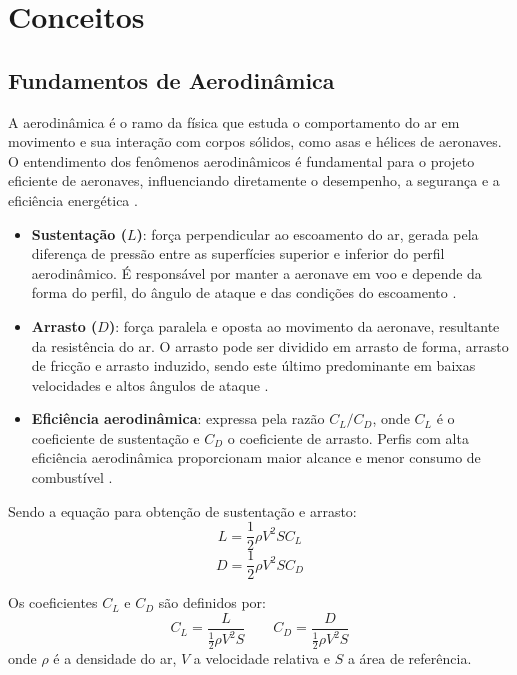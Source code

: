 \chapter{Conceitos}

\section{Fundamentos de Aerodinâmica}
A aerodinâmica é o ramo da física que estuda o comportamento do ar em movimento e sua interação com corpos sólidos, como asas e hélices de aeronaves. O entendimento dos fenômenos aerodinâmicos é fundamental para o projeto eficiente de aeronaves, influenciando diretamente o desempenho, a segurança e a eficiência energética \cite{anderson2017fundamentals}.

\begin{itemize}
    \item \textbf{Sustentação (\(L\))}: força perpendicular ao escoamento do ar, gerada pela diferença de pressão entre as superfícies superior e inferior do perfil aerodinâmico. É responsável por manter a aeronave em voo e depende da forma do perfil, do ângulo de ataque e das condições do escoamento \cite{anderson2017fundamentals}.
    \item \textbf{Arrasto (\(D\))}: força paralela e oposta ao movimento da aeronave, resultante da resistência do ar. O arrasto pode ser dividido em arrasto de forma, arrasto de fricção e arrasto induzido, sendo este último predominante em baixas velocidades e altos ângulos de ataque \cite{raymer2018aircraft}.
    \item \textbf{Eficiência aerodinâmica}: expressa pela razão \(C_L/C_D\), onde \(C_L\) é o coeficiente de sustentação e \(C_D\) o coeficiente de arrasto. Perfis com alta eficiência aerodinâmica proporcionam maior alcance e menor consumo de combustível \cite{abbott1959theory}.
\end{itemize}

Sendo a equação para obtenção de sustentação e arrasto:
\begin{equation}
    L = \frac{1}{2} \rho V^2 S C_L
    \label{eq:sustentacao}
\end{equation}
\begin{equation}
    D = \frac{1}{2} \rho V^2 S C_D
    \label{eq:arrasto}
\end{equation}

Os coeficientes \(C_L\) e \(C_D\) são definidos por:
\[
    C_L = \frac{L}{\frac{1}{2} \rho V^2 S}
    \qquad
    C_D = \frac{D}{\frac{1}{2} \rho V^2 S}
\]
onde \(\rho\) é a densidade do ar, \(V\) a velocidade relativa e \(S\) a área de referência.

